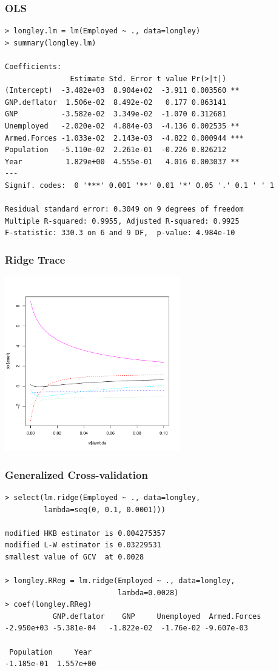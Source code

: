 \documentclass[]{beamer}\usepackage[]{graphicx}\usepackage[]{color}
\begin{document}
\begin{frame}[fragile]
  \frametitle{OLS}
\begin{small}
\begin{verbatim}
> longley.lm = lm(Employed ~ ., data=longley)
> summary(longley.lm)

Coefficients:
               Estimate Std. Error t value Pr(>|t|)
(Intercept)  -3.482e+03  8.904e+02  -3.911 0.003560 **
GNP.deflator  1.506e-02  8.492e-02   0.177 0.863141
GNP          -3.582e-02  3.349e-02  -1.070 0.312681
Unemployed   -2.020e-02  4.884e-03  -4.136 0.002535 **
Armed.Forces -1.033e-02  2.143e-03  -4.822 0.000944 ***
Population   -5.110e-02  2.261e-01  -0.226 0.826212
Year          1.829e+00  4.555e-01   4.016 0.003037 **
---
Signif. codes:  0 '***' 0.001 '**' 0.01 '*' 0.05 '.' 0.1 ' ' 1

Residual standard error: 0.3049 on 9 degrees of freedom
Multiple R-squared: 0.9955,	Adjusted R-squared: 0.9925
F-statistic: 330.3 on 6 and 9 DF,  p-value: 4.984e-10
\end{verbatim}
\end{small}
\end{frame}
\begin{frame}
  \frametitle{Ridge Trace}
  \centerline{\includegraphics[height=3in]{ridge-trace}}
\end{frame}
\begin{frame}[fragile]
\frametitle{Generalized Cross-validation}
\begin{small}
\begin{verbatim}
> select(lm.ridge(Employed ~ ., data=longley,
         lambda=seq(0, 0.1, 0.0001)))

modified HKB estimator is 0.004275357
modified L-W estimator is 0.03229531
smallest value of GCV  at 0.0028

> longley.RReg = lm.ridge(Employed ~ ., data=longley,
                          lambda=0.0028)
> coef(longley.RReg)
           GNP.deflator    GNP     Unemployed  Armed.Forces
-2.950e+03 -5.381e-04   -1.822e-02  -1.76e-02 -9.607e-03

 Population     Year
-1.185e-01  1.557e+00
\end{verbatim}

\end{small}

\end{frame}
\end{document}
